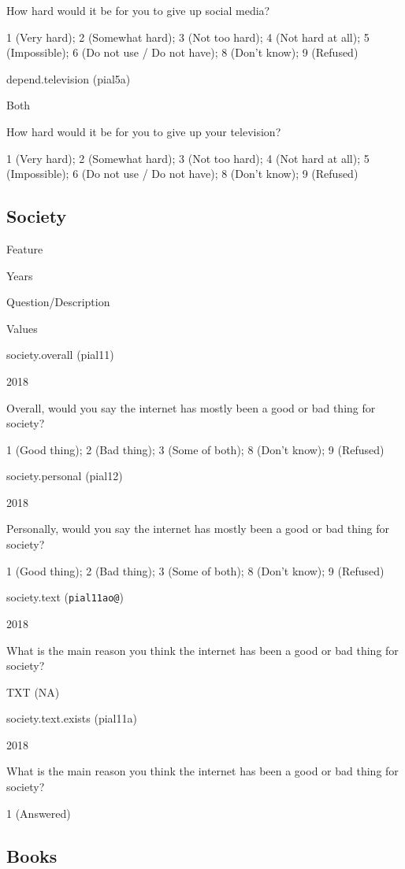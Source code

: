 \documentclass[]{book}
\begin{document}
How hard would it be for you to give up social media?

1 (Very hard); 2 (Somewhat hard); 3 (Not too hard); 4 (Not hard at all);
5 (Impossible); 6 (Do not use / Do not have); 8 (Don't know); 9
(Refused)

depend.television (pial5a)

Both

How hard would it be for you to give up your television?

1 (Very hard); 2 (Somewhat hard); 3 (Not too hard); 4 (Not hard at all);
5 (Impossible); 6 (Do not use / Do not have); 8 (Don't know); 9
(Refused)

\subsection*{Society}\label{society}

Feature

Years

Question/Description

Values

society.overall (pial11)

2018

Overall, would you say the internet has mostly been a good or bad thing
for society?

1 (Good thing); 2 (Bad thing); 3 (Some of both); 8 (Don't know); 9
(Refused)

society.personal (pial12)

2018

Personally, would you say the internet has mostly been a good or bad
thing for society?

1 (Good thing); 2 (Bad thing); 3 (Some of both); 8 (Don't know); 9
(Refused)

society.text (\texttt{pial11ao@})

2018

What is the main reason you think the internet has been a good or bad
thing for society?

TXT (NA)

society.text.exists (pial11a)

2018

What is the main reason you think the internet has been a good or bad
thing for society?

1 (Answered)

\subsection*{Books}\label{books}
\end{document}
